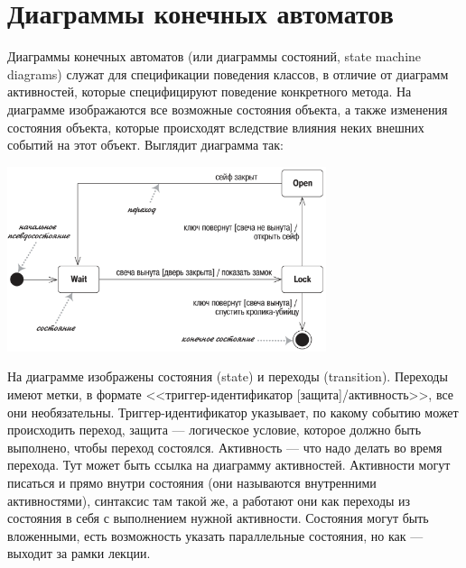 \documentclass{../../text-style}
\begin{document}
\section{Диаграммы конечных автоматов}

Диаграммы конечных автоматов (или диаграммы состояний, state machine diagrams) служат для спецификации поведения классов, в отличие от диаграмм активностей, которые специфицируют поведение конкретного метода. На диаграмме изображаются все возможные состояния объекта, а также изменения состояния объекта, которые происходят вследствие влияния неких внешних событий на этот объект. Выглядит диаграмма так:

\begin{center}
    \includegraphics[width=0.7\textwidth]{stateTransitionSyntax.png}
\end{center}

На диаграмме изображены состояния (state) и переходы (transition). Переходы имеют метки, в формате <<триггер-идентификатор [защита]/активность>>, все они необязательны. Триггер-идентификатор указывает, по какому событию может происходить переход, защита --- логическое условие, которое должно быть выполнено, чтобы переход состоялся. Активность --- что надо делать во время перехода. Тут может быть ссылка на диаграмму активностей. Активности могут писаться и прямо внутри состояния (они называются внутренними активностями), синтаксис там такой же, а работают они как переходы из состояния в себя с выполнением нужной активности. Состояния могут быть вложенными, есть возможность указать параллельные состояния, но как --- выходит за рамки лекции.
\end{document}
